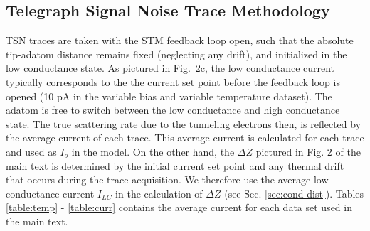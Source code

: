 \documentclass[reprint,amsmath,amssymb,aps,nofootinbib,onecolumn]{revtex4-2}
\begin{document}
\subsection{Telegraph Signal Noise Trace Methodology}
TSN traces are taken with the STM feedback loop open, such that the absolute tip-adatom distance remains fixed (neglecting any drift), and initialized in the low conductance state. As pictured in Fig.~2c, the low conductance current typically corresponds to the the current set point before the feedback loop is opened (10 pA in the variable bias and variable temperature dataset). The adatom is free to switch between the low conductance and high conductance state. The true scattering rate due to the tunneling electrons then, is reflected by the average current of each trace. This average current is calculated for each trace and used as $I_o$ in the model. On the other hand, the $\Delta Z$ pictured in Fig. 2 of the main text is determined by the initial current set point and any thermal drift that occurs during the trace acquisition. We therefore use the average low conductance current $I_{LC}$ in the calculation of $\Delta Z$ (see Sec. \ref{sec:cond-dist}). Tables \ref{table:temp} - \ref{table:curr} contains the average current for each data set used in the main text.  
\end{document}
